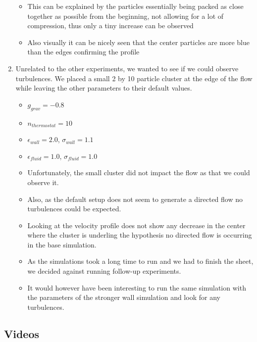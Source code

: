 \documentclass{article}
\begin{document}
\begin{enumerate}
\begin{itemize}
            \item This can be explained by the particles essentially being packed as close together as possible from the beginning, not allowing for a lot of compression, thus only a tiny increase can be observed
            \item Also visually it can be nicely seen that the center particles are more blue than the edges confirming the profile
        \end{itemize}
        \item Unrelated to the other experiments, we wanted to see if we could observe turbulences. We placed a small 2 by 10 particle cluster at the edge of the flow while leaving the other parameters to their default values.
        \begin{itemize}
            \item $g_{grav} = -0.8$
            \item $n_{thermostat} = 10$
            \item $\epsilon_{wall} = 2.0$, $\sigma_{wall} = 1.1$
            \item $\epsilon_{fluid} = 1.0$, $\sigma_{fluid} = 1.0$
            \item Unfortunately, the small cluster did not impact the flow as that we could observe it.
            \item Also, as the default setup does not seem to generate a directed flow no turbulences could be expected.
            \item Looking at the velocity profile does not show any decrease in the center where the cluster is underling the hypothesis no directed flow is occurring in the base simulation.
            \item As the simulations took a long time to run and we had to finish the sheet, we decided against running follow-up experiments.
            \item It would however have been interesting to run the same simulation with the parameters of the stronger wall simulation and look for any turbulences.
        \end{itemize}
        
    \end{enumerate}

\subsection{Videos}
\label{sec:nano:video}
\end{document}
